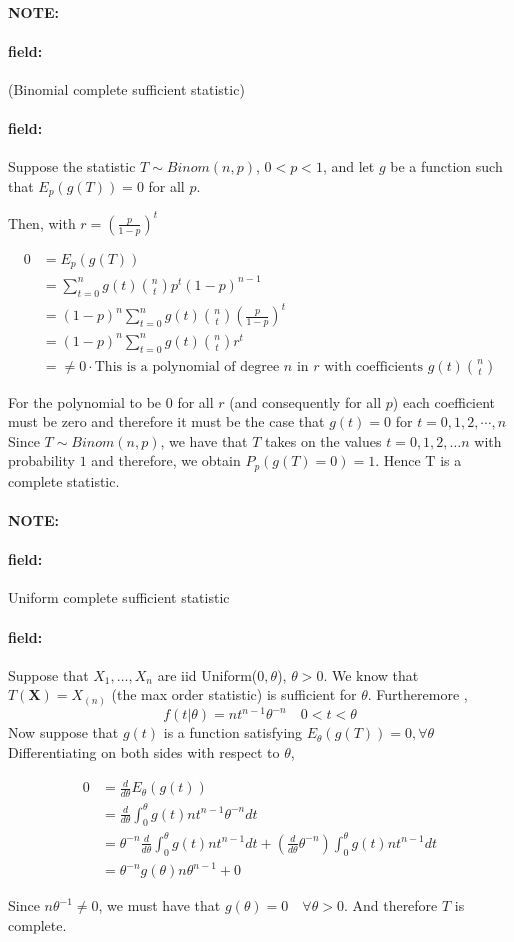 \documentclass[12pt]{article}
\newenvironment{note}{\paragraph{NOTE:}}{}
\newenvironment{field}{\paragraph{field:}}{}
\begin{document}
\begin{note}
  \begin{field}
    (Binomial complete sufficient statistic)
  \end{field}
  \begin{field}
    Suppose the statistic $T \sim Binom(n,p)$, $0 < p < 1$, and let $g$ be a function such that $E_p(g(T)) = 0$ for all $p$.

    Then, with $r = (\frac{p}{1-p})^t$

    \begin{align*}
      0 &= E_p(g(T))\\
      &= \sum_{t=0}^n g(t) \binom{n}{t}p^t(1-p)^{n-1}\\
      &= (1-p)^n \sum_{t = 0}^n g(t)\binom{n}{t}(\frac{p}{1-p})^t\\
      &= (1-p)^n \sum_{t = 0}^n g(t)\binom{n}{t}r^t\\
      &= \neq 0 \cdot \text{This is a polynomial of degree }n \text{ in } r \text{ with coefficients } g(t)\binom{n}{t}
    \end{align*}

    For the polynomial to be $0$ for all $r$ (and consequently for all $p$) each coefficient must be zero and therefore it must be the case that $g(t) = 0$ for $t = 0, 1, 2, \cdots , n$ Since $T \sim Binom(n,p)$, we have that $T$ takes on the values $t = 0,1,2,\ldots n$ with probability $1$ and therefore, we obtain $P_p(g(T)=0)=1$. Hence T is a complete statistic.
  \end{field}
\end{note}


\begin{note}
  \begin{field}
    Uniform complete sufficient statistic
  \end{field}
  \begin{field}
    Suppose that $X_1, \ldots , X_n$ are iid Uniform($0,\theta$), $\theta > 0$. We know that $T(\mathbf{X}) = X_{(n)}$ (the max order statistic) is sufficient for $\theta$. Furtheremore ,
    $$ f(t|\theta) = nt^{n-1}\theta^{-n} \quad 0 < t < \theta$$
    Now suppose that $g(t)$ is a function satisfying $E_\theta(g(T)) =0, \forall \theta$
    Differentiating on both sides with respect to $\theta$,

    \begin{align*}
       0 &= \frac{d}{d\theta} E_\theta(g(t))\\
       &= \frac{d}{d\theta} \int_0^\theta g(t)nt^{n-1}\theta^{-n} dt\\
       &= \theta^{-n}\frac{d}{d\theta} \int_0^\theta g(t)nt^{n-1} dt + (\frac{d}{d\theta}\theta^{-n}) \int_0^\theta g(t)nt^{n-1}dt \\
       &= \theta^{-n}g(\theta)n\theta^{n-1} + 0
    \end{align*}

    Since $n\theta^{-1} \neq 0$, we must have that $g(\theta) =0 \quad \forall \theta> 0$. And therefore $T$ is complete.
  \end{field}
\end{note}
\end{document}

